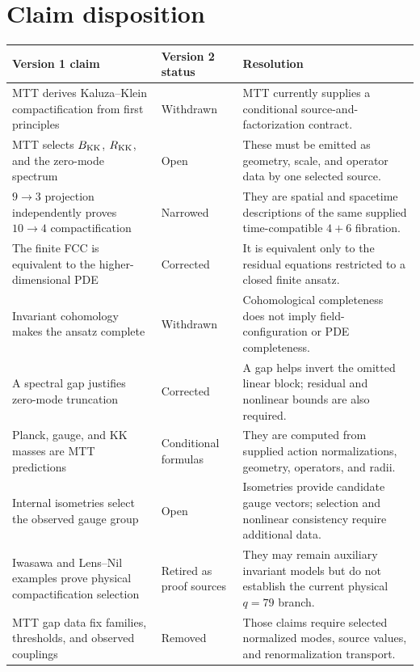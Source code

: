 \documentclass[11pt]{article}
\theoremstyle{definition}
\theoremstyle{remark}
\begin{document}
\section{Claim disposition}
\label{sec:audit}

\renewcommand{\arraystretch}{1.2}
\begin{tabularx}{\textwidth}{@{}p{}p{}X@{}}
\toprule
Version 1 claim & Version 2 status & Resolution \\
\midrule
MTT derives Kaluza--Klein compactification from first principles
& Withdrawn
& MTT currently supplies a conditional source-and-factorization contract. \\

MTT selects \(B_{\rm KK}\), \(R_{\rm KK}\), and the zero-mode spectrum
& Open
& These must be emitted as geometry, scale, and operator data by one
  selected source. \\

\(9\to3\) projection independently proves \(10\to4\) compactification
& Narrowed
& They are spatial and spacetime descriptions of the same supplied
  time-compatible \(4+6\) fibration. \\

The finite FCC is equivalent to the higher-dimensional PDE
& Corrected
& It is equivalent only to the residual equations restricted to a closed
  finite ansatz. \\

Invariant cohomology makes the ansatz complete
& Withdrawn
& Cohomological completeness does not imply field-configuration or PDE
  completeness. \\

A spectral gap justifies zero-mode truncation
& Corrected
& A gap helps invert the omitted linear block; residual and nonlinear bounds
  are also required. \\

Planck, gauge, and KK masses are MTT predictions
& Conditional formulas
& They are computed from supplied action normalizations, geometry, operators,
  and radii. \\

Internal isometries select the observed gauge group
& Open
& Isometries provide candidate gauge vectors; selection and nonlinear
  consistency require additional data. \\

Iwasawa and Lens--Nil examples prove physical compactification selection
& Retired as proof sources
& They may remain auxiliary invariant models but do not establish the
  current physical \(q=79\) branch. \\

MTT gap data fix families, thresholds, and observed couplings
& Removed
& Those claims require selected normalized modes, source values, and
  renormalization transport. \\
\bottomrule
\end{tabularx}
\end{document}
